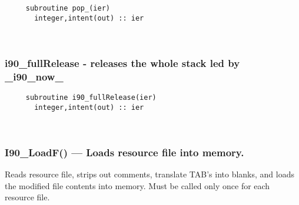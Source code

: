 \begin{verbatim} 
     subroutine pop_(ier)
       integer,intent(out) :: ier
 \end{verbatim}%
 
 
\mbox{}\hrulefill\ 

  \subsubsection{i90\_fullRelease - releases the whole stack led by \_i90\_now\_}

\begin{verbatim} 
     subroutine i90_fullRelease(ier)
       integer,intent(out) :: ier
 \end{verbatim}%
 
 
\mbox{}\hrulefill\ 

  \subsubsection{I90\_LoadF() --- Loads resource file into memory. }

    Reads resource file, strips out comments, translate TAB's into
    blanks, and loads the modified file contents into memory.
    Must be called only once for each resource file.
  
